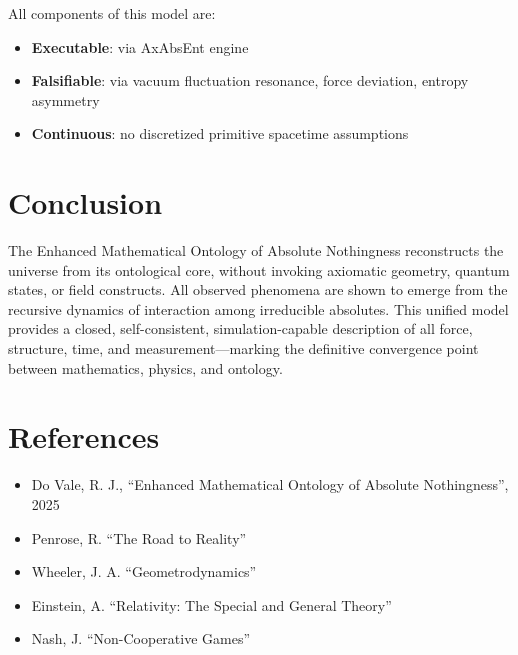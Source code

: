 \documentclass[11pt]{article}
\begin{document}
All components of this model are:
\begin{itemize}[noitemsep]
    \item \textbf{Executable}: via AxAbsEnt engine
    \item \textbf{Falsifiable}: via vacuum fluctuation resonance, force deviation, entropy asymmetry
    \item \textbf{Continuous}: no discretized primitive spacetime assumptions
\end{itemize}

\section{Conclusion}

The Enhanced Mathematical Ontology of Absolute Nothingness reconstructs the universe from its ontological core, without invoking axiomatic geometry, quantum states, or field constructs. All observed phenomena are shown to emerge from the recursive dynamics of interaction among irreducible absolutes. This unified model provides a closed, self-consistent, simulation-capable description of all force, structure, time, and measurement—marking the definitive convergence point between mathematics, physics, and ontology.

\section*{References}

\vspace{-1em}
\begin{itemize}
    \item Do Vale, R. J., “Enhanced Mathematical Ontology of Absolute Nothingness”, 2025
    \item Penrose, R. “The Road to Reality”
    \item Wheeler, J. A. “Geometrodynamics”
    \item Einstein, A. “Relativity: The Special and General Theory”
    \item Nash, J. “Non-Cooperative Games”
\end{itemize}
\end{document}

